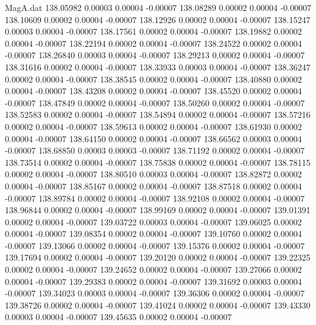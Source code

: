 \begin{filecontents}{MagA.dat}
 138.05982    0.00003    0.00004   -0.00007
 138.08289    0.00002    0.00004   -0.00007
 138.10609    0.00002    0.00004   -0.00007
 138.12926    0.00002    0.00004   -0.00007
 138.15247    0.00003    0.00004   -0.00007
 138.17561    0.00002    0.00004   -0.00007
 138.19882    0.00002    0.00004   -0.00007
 138.22194    0.00002    0.00004   -0.00007
 138.24522    0.00002    0.00004   -0.00007
 138.26840    0.00003    0.00004   -0.00007
 138.29213    0.00002    0.00004   -0.00007
 138.31616    0.00002    0.00004   -0.00007
 138.33933    0.00003    0.00004   -0.00007
 138.36247    0.00002    0.00004   -0.00007
 138.38545    0.00002    0.00004   -0.00007
 138.40880    0.00002    0.00004   -0.00007
 138.43208    0.00002    0.00004   -0.00007
 138.45520    0.00002    0.00004   -0.00007
 138.47849    0.00002    0.00004   -0.00007
 138.50260    0.00002    0.00004   -0.00007
 138.52583    0.00002    0.00004   -0.00007
 138.54894    0.00002    0.00004   -0.00007
 138.57216    0.00002    0.00004   -0.00007
 138.59613    0.00002    0.00004   -0.00007
 138.61930    0.00002    0.00004   -0.00007
 138.64150    0.00002    0.00004   -0.00007
 138.66562    0.00003    0.00004   -0.00007
 138.68850    0.00003    0.00003   -0.00007
 138.71192    0.00002    0.00004   -0.00007
 138.73514    0.00002    0.00004   -0.00007
 138.75838    0.00002    0.00004   -0.00007
 138.78115    0.00002    0.00004   -0.00007
 138.80510    0.00003    0.00004   -0.00007
 138.82872    0.00002    0.00004   -0.00007
 138.85167    0.00002    0.00004   -0.00007
 138.87518    0.00002    0.00004   -0.00007
 138.89784    0.00002    0.00004   -0.00007
 138.92108    0.00002    0.00004   -0.00007
 138.96844    0.00002    0.00004   -0.00007
 138.99169    0.00002    0.00004   -0.00007
 139.01391    0.00002    0.00004   -0.00007
 139.03722    0.00003    0.00004   -0.00007
 139.06025    0.00002    0.00004   -0.00007
 139.08354    0.00002    0.00004   -0.00007
 139.10760    0.00002    0.00004   -0.00007
 139.13066    0.00002    0.00004   -0.00007
 139.15376    0.00002    0.00004   -0.00007
 139.17694    0.00002    0.00004   -0.00007
 139.20120    0.00002    0.00004   -0.00007
 139.22325    0.00002    0.00004   -0.00007
 139.24652    0.00002    0.00004   -0.00007
 139.27066    0.00002    0.00004   -0.00007
 139.29383    0.00002    0.00004   -0.00007
 139.31692    0.00003    0.00004   -0.00007
 139.34023    0.00003    0.00004   -0.00007
 139.36306    0.00002    0.00004   -0.00007
 139.38726    0.00002    0.00004   -0.00007
 139.41024    0.00002    0.00004   -0.00007
 139.43330    0.00003    0.00004   -0.00007
 139.45635    0.00002    0.00004   -0.00007

\end{filecontents}
